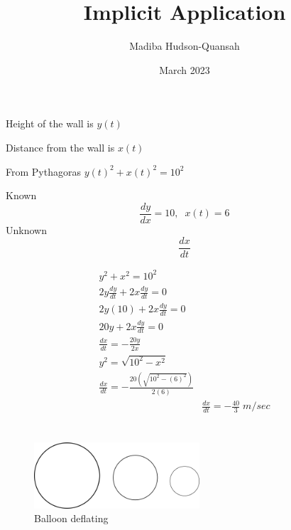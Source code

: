 \documentclass[16pt letter]{article}
\title{Implicit Application}
\author{Madiba Hudson-Quansah}
\date{March 2023}
\begin{document}
\maketitle
\pagebreak

\tableofcontents
\pagebreak

\section{}
\label{q:1}

Height of the wall is $y(t)$

Distance from the wall is $x(t)$

From Pythagoras $y(t)^2+x(t)^2 = 10^2$

Known \[\frac{dy}{dx} = 10, \;\; x(t) = 6\]
Unknown \[\frac{dx}{dt}\]

\begin{align*}
	y^2 +x^2 = 10^2                                     \\
	2y \frac{dy}{dt} + 2x \frac{dy}{dt} = 0             \\
	2y(10) + 2x \frac{dy}{dt} = 0                       \\
	20y + 2x \frac{dy}{dt} = 0                          \\
	\frac{dx}{dt} = -\frac{20y}{2x}                     \\
	y^2 = \sqrt{10^2 - x^2}                             \\
	\frac{dx}{dt} = -\frac{20(\sqrt{10^2-(6)^2})}{2(6)} \\
	 & \frac{dx}{dt} = -\frac{40}{3} \; m/sec
\end{align*}
\pagebreak

\section{}
\label{q:2}

\begin{figure}[h]
	\centering
	\includegraphics[width=0.55\textwidth]{Application Q2}
	\caption{Balloon deflating}
	\label{fig:deflating}
\end{figure}
\end{document}

